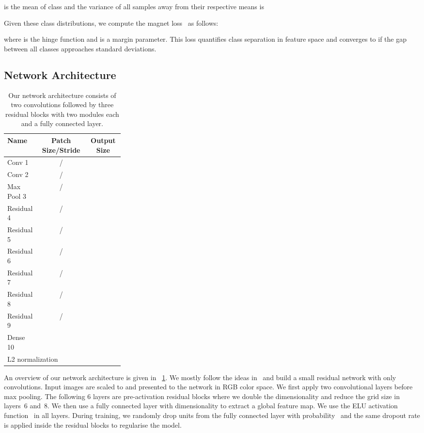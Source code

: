 \documentclass{article}
\begin{document}
is the mean of class  and the variance of all samples away
from their respective means is

Given these class distributions, we compute the magnet loss~\cite{Rippel2016a}
as follows:

where  is the hinge function and  is a
margin parameter.
This loss quantifies class separation in feature space and converges to 
if the gap between all classes approaches  standard deviations.

\subsection{Network Architecture}

\begin{table}[t!]
    \begin{tabular}{p{0.28\linewidth}cc}
        \toprule
        \textbf{Name} & \textbf{Patch Size/Stride} & \textbf{Output Size} \\
        \midrule
        Conv 1 & / &  \\
        Conv 2 & / &  \\
        Max Pool 3 & / &  \\
        Residual 4 & / &  \\
        Residual 5 & / &  \\
        Residual 6 & / &  \\
        Residual 7 & / &  \\
        Residual 8 & / &  \\
        Residual 9 & / &  \\
        Dense 10 & &  \\
        \multicolumn{2}{l}{L2 normalization} &  \\
        \bottomrule
    \end{tabular}
    \caption{Our network architecture consists of two convolutions followed by
    three residual blocks with two modules each and a fully connected
    layer.}
\label{tab:network-architecture}
\end{table}

An overview of our network architecture is given in
\tablename~\ref{tab:network-architecture}.
We mostly follow the ideas in~\cite{Zagoruyko2016} and build a small
residual network with only  convolutions.
Input images are scaled to  and presented to the network in
RGB color space.
We first apply two convolutional layers before max pooling.
The following 6 layers are pre-activation residual
blocks where we double the dimensionality and reduce the grid size in
layers~6 and~8.
We then use a fully connected layer with dimensionality  to extract
a global feature map.
We use the ELU activation function~\cite{Clevert2015} in all layers.
During training, we randomly drop units from the fully connected layer with
probability~ and the same dropout rate is applied inside the residual
blocks to regularise the model.
\end{document}
